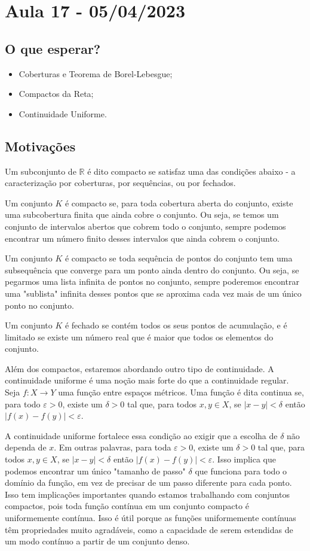 \documentclass[analysis_notes.tex]{subfiles}
\begin{document}
\section{Aula 17 - 05/04/2023}
\subsection{O que esperar?}
\begin{itemize}
	\item Coberturas e Teorema de Borel-Lebesgue;
	\item Compactos da Reta;
	\item Continuidade Uniforme.
\end{itemize}
\subsection{Motivações}
Um subconjunto de $\mathbb{R}$ é dito compacto se satisfaz uma das condições abaixo - a caracterização por coberturas, por sequências, ou
por fechados.

Um conjunto $K$ é compacto se, para toda cobertura aberta do conjunto, existe uma subcobertura finita que ainda cobre o conjunto.
Ou seja, se temos um conjunto de intervalos abertos que cobrem todo o conjunto, sempre podemos encontrar um número finito desses intervalos
que ainda cobrem o conjunto.

Um conjunto $K$ é compacto se toda sequência de pontos do conjunto tem uma subsequência que converge para um ponto ainda dentro
do conjunto. Ou seja, se pegarmos uma lista infinita de pontos no conjunto, sempre poderemos encontrar uma "sublista" infinita
desses pontos que se aproxima cada vez mais de um único ponto no conjunto.

Um conjunto $K$ é fechado se contém todos os seus pontos de acumulação, e é limitado se existe um número real que é maior que todos os elementos do conjunto.

Além dos compactos, estaremos abordando outro tipo de continuidade. A continuidade uniforme é uma noção mais forte do que a continuidade regular. Seja $f: X \rightarrow Y$ uma função entre espaços métricos. Uma função é dita continua se, para todo $\varepsilon > 0$, existe um $\delta > 0$ tal que, para todos $x, y \in X$, se $|x - y| < \delta$ então $|f(x) - f(y)| < \varepsilon$.

A continuidade uniforme fortalece essa condição ao exigir que a escolha de $\delta$ não dependa de $x$. Em outras palavras,
para toda $\varepsilon > 0$, existe um $\delta > 0$ tal que, para todos $x, y \in X$, se $|x - y| < \delta$ então
$|f(x) - f(y)| < \varepsilon$. Isso implica que podemos encontrar um único "tamanho de passo" $\delta$ que funciona para todo
o domínio da função, em vez de precisar de um passo diferente para cada ponto.
Isso tem implicações importantes quando estamos trabalhando com conjuntos compactos, pois toda função contínua em um
conjunto compacto é uniformemente contínua. Isso é útil porque as funções uniformemente contínuas têm propriedades muito agradáveis,
como a capacidade de serem estendidas de um modo contínuo a partir de um conjunto denso.
\end{document}
